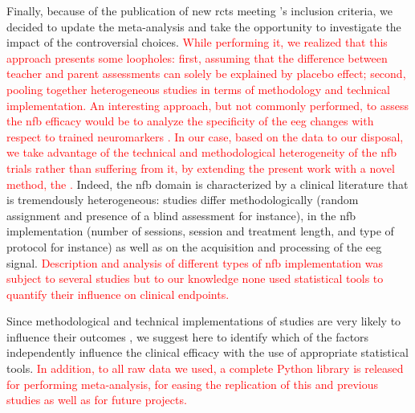 Finally, because of the publication of new \glspl{rct} meeting \citeauthor{Cortese2016}'s inclusion criteria, we
decided to update the meta-analysis and take the opportunity to investigate the impact of the controversial choices.
\textcolor{red}{While performing it, we realized that this approach presents some loopholes: first, assuming that the difference between teacher and parent
assessments can solely be explained by placebo effect; second, pooling together heterogeneous studies in terms of methodology and technical
implementation. An interesting approach, but not commonly performed, to assess the \gls{nfb} efficacy would be to analyze the specificity of the \gls{eeg} changes with respect 
to trained neuromarkers \citep{Maurizio2014}. In our case, based on the data to our disposal, we take advantage of the technical and methodological heterogeneity 
of the \gls{nfb} trials rather than suffering from it, by extending the present work with a novel method, the .} Indeed, the \gls{nfb} domain is 
characterized by a clinical literature that is tremendously heterogeneous: studies differ methodologically (random assignment and 
presence of a blind assessment for instance), in the \gls{nfb} implementation (number of sessions, session and treatment length,
and type of protocol for instance) as well as on the acquisition and processing of the \gls{eeg} signal. \textcolor{red}{Description and analysis of different types 
of \gls{nfb} implementation was subject to several studies \citep{Arns2014, Enriquez2017, Vernon2004, Jeunet2018} but to our knowledge none used statistical 
tools to quantify their influence on clinical endpoints.}

Since methodological and technical implementations of studies are very likely to influence their outcomes \citep{Congedo2004}, we suggest 
here to identify which of the factors independently influence the clinical efficacy with the use of appropriate statistical tools. 
\textcolor{red}{In addition, to all raw data we used, a complete Python library is released for performing meta-analysis, for easing the replication of 
this and previous studies as well as for future projects.}








